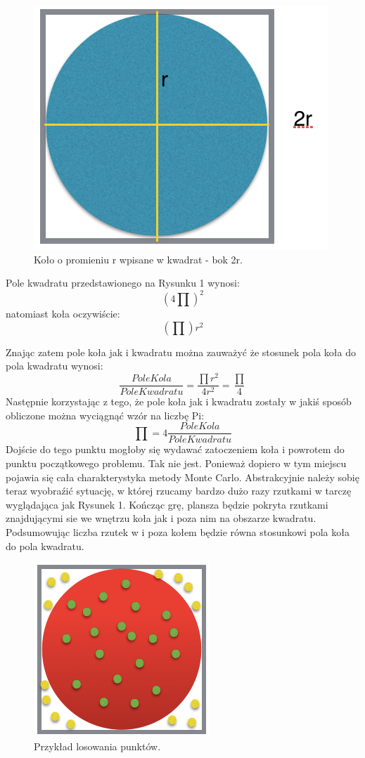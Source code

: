 \documentclass[a4paper,12pt]{article}		%
\begin{document}
\begin{center}
\begin{figure}[h!]
\centering
\includegraphics[scale=0.5]{Resources/Kolo_rysunek.png}
\caption{Koło o promieniu r wpisane w kwadrat - bok 2r.}
\end{figure}
\end{center}

Pole kwadratu przedstawionego na Rysunku 1 wynosi:
 \[(4\prod)^{2}\]
 natomiast koła oczywiście:
 \[(\prod)r^{2}\]
 \newpage
 
 Znając zatem pole koła jak i kwadratu można zauważyć że stosunek pola koła do pola kwadratu wynosi:
\[ \frac{PoleKola}{PoleKwadratu}=\frac{\prod r^{2}}{4r^{2} }= \frac{\prod}{4}\]
Następnie korzystając z tego, że pole koła jak i kwadratu zostały w jakiś sposób obliczone można wyciągnąć wzór na liczbę Pi:
\[\prod =4\frac{PoleKola}{PoleKwadratu}\]
Dojście do tego punktu mogłoby się wydawać zatoczeniem koła i powrotem do punktu początkowego problemu. Tak nie jest. Ponieważ dopiero w tym miejscu pojawia się cała charakterystyka metody Monte Carlo. Abstrakcyjnie należy sobię teraz wyobraźić sytuację, w której rzucamy bardzo dużo razy rzutkami w tarczę wyglądająca jak Rysunek 1. Kończąc grę, plansza będzie pokryta rzutkami znajdującymi sie we wnętrzu koła jak i poza nim na obszarze kwadratu. Podsumowując liczba rzutek w i poza kołem będzie równa stosunkowi pola koła do pola kwadratu.

\begin{center}
\begin{figure}[h!]
\centering
\includegraphics[scale=0.7]{Resources/Losowanie.png}
\caption{Przykład losowania punktów.}
\end{figure}
\end{center}
\end{document}
